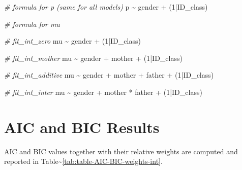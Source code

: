 \documentclass[
]{book}
\newenvironment{Shaded}{\begin{snugshade}}{\end{snugshade}}
\newcommand{\CommentTok}[1]{\textcolor[rgb]{0.56,0.35,0.01}{\textit{#1}}}
\newcommand{\DecValTok}[1]{\textcolor[rgb]{0.00,0.00,0.81}{#1}}
\newcommand{\NormalTok}[1]{#1}
\newcommand{\SpecialCharTok}[1]{\textcolor[rgb]{0.00,0.00,0.00}{#1}}
\begin{document}
\begin{Shaded}
\begin{Highlighting}[]
\CommentTok{\# formula for p (same for all models)}
\NormalTok{p }\SpecialCharTok{\textasciitilde{}}\NormalTok{ gender }\SpecialCharTok{+}\NormalTok{ (}\DecValTok{1}\SpecialCharTok{|}\NormalTok{ID\_class)}

\CommentTok{\# formula for mu}

\CommentTok{\# fit\_int\_zero}
\NormalTok{mu }\SpecialCharTok{\textasciitilde{}}\NormalTok{ gender }\SpecialCharTok{+}\NormalTok{ (}\DecValTok{1}\SpecialCharTok{|}\NormalTok{ID\_class)}

\CommentTok{\# fit\_int\_mother}
\NormalTok{mu }\SpecialCharTok{\textasciitilde{}}\NormalTok{ gender }\SpecialCharTok{+}\NormalTok{ mother }\SpecialCharTok{+}\NormalTok{ (}\DecValTok{1}\SpecialCharTok{|}\NormalTok{ID\_class)}

\CommentTok{\# fit\_int\_additive}
\NormalTok{mu }\SpecialCharTok{\textasciitilde{}}\NormalTok{ gender }\SpecialCharTok{+}\NormalTok{ mother }\SpecialCharTok{+}\NormalTok{ father }\SpecialCharTok{+}\NormalTok{ (}\DecValTok{1}\SpecialCharTok{|}\NormalTok{ID\_class)}

\CommentTok{\# fit\_int\_inter}
\NormalTok{mu }\SpecialCharTok{\textasciitilde{}}\NormalTok{ gender }\SpecialCharTok{+}\NormalTok{ mother }\SpecialCharTok{*}\NormalTok{ father }\SpecialCharTok{+}\NormalTok{ (}\DecValTok{1}\SpecialCharTok{|}\NormalTok{ID\_class)}
\end{Highlighting}
\end{Shaded}

\hypertarget{aic-and-bic-results-1}{%
\section{AIC and BIC Results}\label{aic-and-bic-results-1}}

AIC and BIC values together with their relative weights are computed and reported in Table\textasciitilde\ref{tab:table-AIC-BIC-weights-int}.
\end{document}
